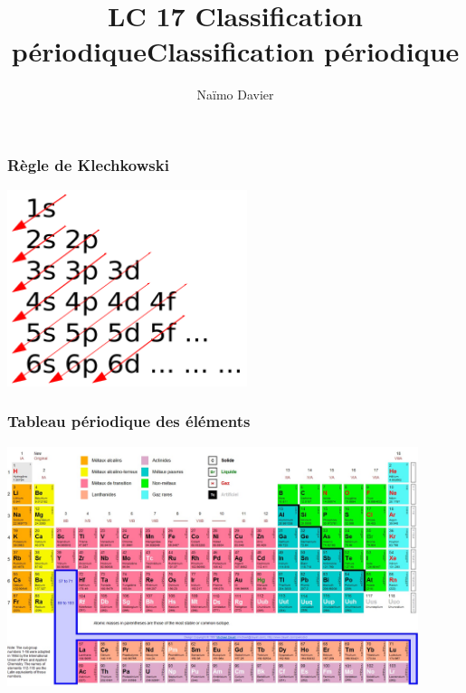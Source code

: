 \documentclass{beamer}
\title{LC 17 Classification périodique}
\author{Naïmo Davier}
\institute{Université Paul sabatier}
\begin{document}
	
\begin{frame}
	\titlepage
\end{frame}

\addtocounter{framenumber}{-1}
\title{Classification périodique}

\begin{frame}
\frametitle{Règle de Klechkowski}
\centerline{\includegraphics[width=7cm]{Klechkovski}}
\end{frame}

\begin{frame}
\frametitle{Tableau périodique des éléments}
\centerline{\includegraphics[width=12cm]{tableau_periodique}}
\end{frame}
\end{document}
